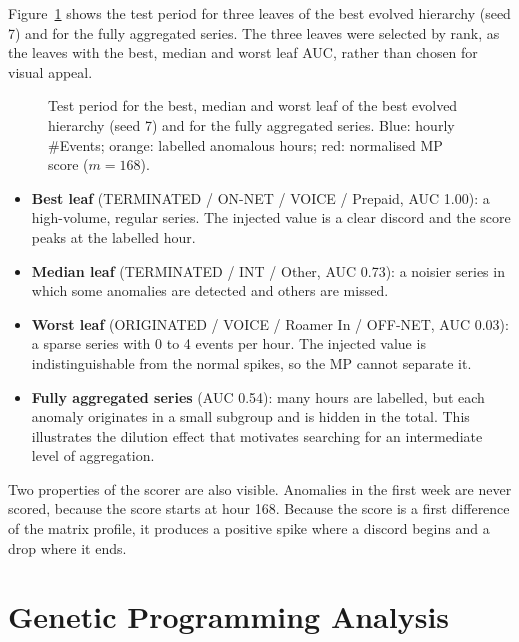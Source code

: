 Figure~\ref{fig:ts-examples} shows the test period for three leaves of the best evolved hierarchy (seed 7) and for the fully aggregated series.
The three leaves were selected by rank, as the leaves with the best, median and worst leaf \ac{AUC}, rather than chosen for visual appeal.

\begin{figure}[htbp]
    \centering
    \caption[Leaf series, labelled anomalies and Matrix Profile scores]{Test period for the best, median and worst leaf of the best evolved hierarchy (seed 7) and for the fully aggregated series. Blue: hourly \#Events; orange: labelled anomalous hours; red: normalised \ac{MP} score ($m = 168$).}
    \label{fig:ts-examples}
\end{figure}

\begin{itemize}
    \item \textbf{Best leaf} (TERMINATED / ON-NET / VOICE / Prepaid, \ac{AUC} 1.00): a high-volume, regular series. The injected value is a clear discord and the score peaks at the labelled hour.
    \item \textbf{Median leaf} (TERMINATED / INT / Other, \ac{AUC} 0.73): a noisier series in which some anomalies are detected and others are missed.
    \item \textbf{Worst leaf} (ORIGINATED / VOICE / Roamer In / OFF-NET, \ac{AUC} 0.03): a sparse series with 0 to 4 events per hour. The injected value is indistinguishable from the normal spikes, so the \ac{MP} cannot separate it.
    \item \textbf{Fully aggregated series} (\ac{AUC} 0.54): many hours are labelled, but each anomaly originates in a small subgroup and is hidden in the total. This illustrates the dilution effect that motivates searching for an intermediate level of aggregation.
\end{itemize}

Two properties of the scorer are also visible.
Anomalies in the first week are never scored, because the score starts at hour 168.
Because the score is a first difference of the matrix profile, it produces a positive spike where a discord begins and a drop where it ends.

\section{Genetic Programming Analysis}
\label{sec:ge-analysis}

